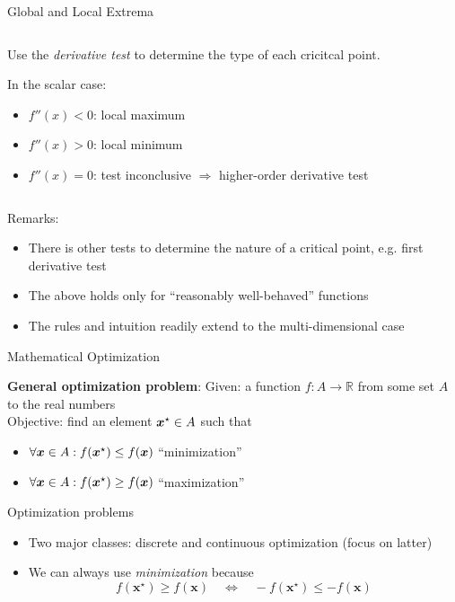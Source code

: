 \begin{frame}{Global and Local Extrema}
    \begin{columns}[onlytextwidth]
        \begin{column}{0.6\textwidth}
            Use the \emph{derivative test} to determine the type of each cricitcal point.

            In the scalar case:
            \begin{itemize}
                \item $f''(x) < 0$: local maximum
                \item $f''(x) > 0$: local minimum
                \item $f''(x) = 0$: test inconclusive $\Rightarrow$ higher-order derivative test
            \end{itemize}

        \end{column}
        \begin{column}{0.4\textwidth}
            
        \end{column}
    \end{columns}

    Remarks:
    \begin{itemize}
        \item There is other tests to determine the nature of a critical point, e.g. first derivative test
        \item The above holds only for ``reasonably well-behaved'' functions
        \item The rules and intuition readily extend to the multi-dimensional case
    \end{itemize}


\end{frame}

\begin{frame}{Mathematical Optimization}
    \begin{boxed}
        \textbf{General optimization problem}:
        Given: a function $f : A \rightarrow \mathbb{R}$ from some set $A$ to the real numbers\\[1mm]
        Objective: find an element $\bm{x}^\star \in A$ such that
        \begin{itemize}
            \item $\forall \bm{x} \in A : f(\bm{x}^\star) \leq f(\bm{x})$ \;\; ``minimization''
            \item $\forall \bm{x} \in A : f(\bm{x}^\star) \geq f(\bm{x})$ \;\; ``maximization''
        \end{itemize}
    \end{boxed}

    Optimization problems
    \begin{itemize}
        \item Two major classes: discrete and continuous optimization (focus on latter)
        \item We can always use \emph{minimization} because
              $$f(\mathbf{x^\star})\geq f(\mathbf{x}) \quad \Longleftrightarrow \quad -f(\mathbf{x^\star})\leq -f(\mathbf{x})$$
    \end{itemize}
\end{frame}


